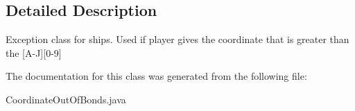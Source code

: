 \subsection{Detailed Description}
Exception class for ships. Used if player gives the coordinate that is greater than the \mbox{[}A-\/J\mbox{]}\mbox{[}0-\/9\mbox{]} 

The documentation for this class was generated from the following file\+:\begin{DoxyCompactItemize}
\item 
Coordinate\+Out\+Of\+Bonds.\+java\end{DoxyCompactItemize}
